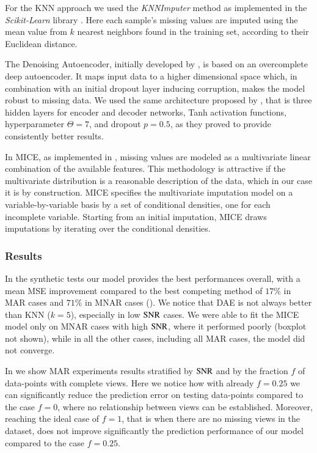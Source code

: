For the KNN approach we used the \textit{KNNImputer} method as implemented in the \textit{Scikit-Learn} library \citep{sklearn}.
Here each sample's missing values are imputed using the mean value from $k$ nearest neighbors found in the training set, according to their Euclidean distance.

The Denoising Autoencoder, initially developed by \cite{Vincent2008}, is based on an overcomplete deep autoencoder.
It maps input data to a higher dimensional space which, in combination with an initial dropout layer inducing corruption, makes the model robust to missing data.
We used the same architecture proposed by \cite{dae}, that is three hidden layers for encoder and decoder networks, Tanh activation functions, hyperparameter $\Theta=7$, and dropout $p=0.5$, as they proved to provide consistently better results.

In MICE, as implemented in \cite{mice}, missing values are modeled as a multivariate linear combination of the available features.
This methodology is attractive if the multivariate distribution is a reasonable description of the data, which in our case it is by construction.
MICE specifies the multivariate imputation model on a variable-by-variable basis by a set of conditional densities, one for each incomplete variable.
Starting from an initial imputation, MICE draws imputations by iterating over the conditional densities.

\subsubsection{Results}


In the synthetic tests our model provides the best performances overall, with a mean MSE improvement compared to the best competing method of $17\%$ in MAR cases and $71\%$ in MNAR cases ().
	We notice that DAE is not always better than KNN ($k=5$), especially in low $\operatorname{SNR}$ cases.
	We were able to fit the MICE model only on MNAR cases with high $\operatorname{SNR}$, where it performed poorly (boxplot not shown), while in all the other cases, including all MAR cases, the model did not converge.

	In  we show MAR experiments results stratified by $\operatorname{SNR}$ and by the fraction $f$ of data-points with complete views.
	Here we notice how with already $f = 0.25$ we can significantly reduce the prediction error on testing data-points compared to the case $f=0$, where no relationship between views can be established.
	Moreover, reaching the ideal case of $f=1$, that is when there are no missing views in the dataset, does not improve significantly the prediction performance of our model compared to the case $f = 0.25$.
